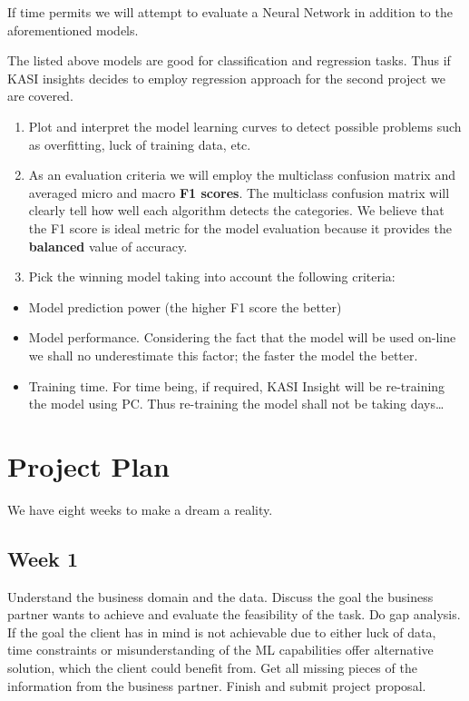 If time permits we will attempt to evaluate a Neural Network in addition
to the aforementioned models.

The listed above models are good for classification and regression
tasks. Thus if KASI insights decides to employ regression approach for
the second project we are covered.

\begin{enumerate}
\def\labelenumi{\arabic{enumi}.}
\setcounter{enumi}{1}
\item
  Plot and interpret the model learning curves to detect possible
  problems such as overfitting, luck of training data, etc.
\item
  As an evaluation criteria we will employ the multiclass confusion
  matrix and averaged micro and macro \textbf{F1 scores}. The multiclass
  confusion matrix will clearly tell how well each algorithm detects the
  categories. We believe that the F1 score is ideal metric for the model
  evaluation because it provides the \textbf{balanced} value of
  accuracy.
\item
  Pick the winning model taking into account the following criteria:
\end{enumerate}

\begin{itemize}
\tightlist
\item
  Model prediction power (the higher F1 score the better)
\item
  Model performance. Considering the fact that the model will be used
  on-line we shall no underestimate this factor; the faster the model
  the better.
\item
  Training time. For time being, if required, KASI Insight will be
  re-training the model using PC. Thus re-training the model shall not
  be taking days\ldots{}
\end{itemize}

\hypertarget{project-plan}{%
\section{Project Plan}\label{project-plan}}

We have eight weeks to make a dream a reality.

\hypertarget{week-1}{%
\subsection{Week 1}\label{week-1}}

Understand the business domain and the data. Discuss the goal the
business partner wants to achieve and evaluate the feasibility of the
task. Do gap analysis. If the goal the client has in mind is not
achievable due to either luck of data, time constraints or
misunderstanding of the ML capabilities offer alternative solution,
which the client could benefit from. Get all missing pieces of the
information from the business partner. Finish and submit project
proposal.

